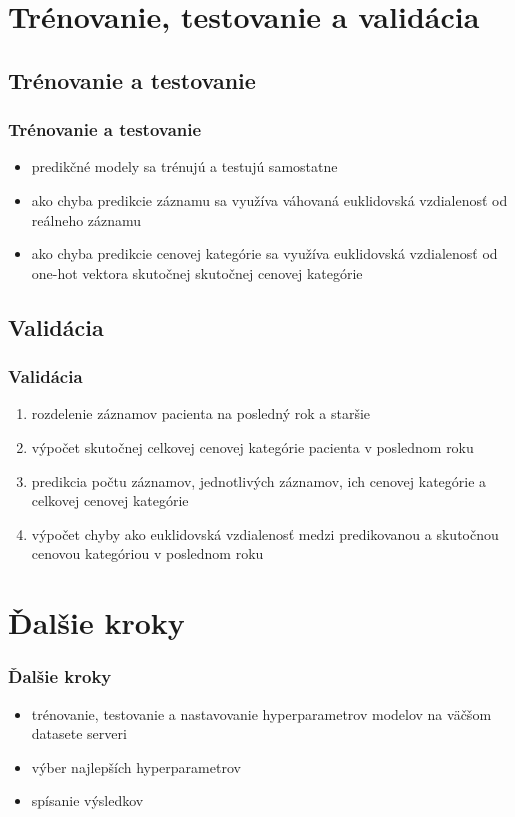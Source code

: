 \documentclass[slovak]{beamer}
\begin{document}
\section{Trénovanie, testovanie a validácia}

\subsection{Trénovanie a testovanie}

\begin{frame}
	\frametitle{Trénovanie a testovanie}
	\begin{itemize}
		\item<1> predikčné modely sa trénujú a testujú samostatne
		\item<1> ako chyba predikcie záznamu sa využíva váhovaná euklidovská vzdialenosť od reálneho záznamu
		\item<1> ako chyba predikcie cenovej kategórie sa využíva euklidovská vzdialenosť od one-hot vektora skutočnej skutočnej cenovej kategórie
		
	\end{itemize}
\end{frame}

\subsection{Validácia}

\begin{frame}
	\frametitle{Validácia}
	
		\begin{enumerate}
			\item<1> rozdelenie záznamov pacienta na posledný rok a staršie 
			\item<1> výpočet skutočnej celkovej cenovej kategórie pacienta v poslednom roku 
			\item<1> predikcia počtu záznamov, jednotlivých záznamov, ich cenovej kategórie a celkovej cenovej kategórie
			\item<1> výpočet chyby ako euklidovská vzdialenosť medzi predikovanou a skutočnou cenovou kategóriou v poslednom roku 
		\end{enumerate}
\end{frame}

\section{Ďalšie kroky}

\begin{frame}
	\frametitle{Ďalšie kroky}
	\begin{itemize}
		\item<1> trénovanie, testovanie a nastavovanie hyperparametrov modelov na väčšom datasete serveri 
		\item<1> výber najlepších hyperparametrov
		\item<1> spísanie výsledkov
	\end{itemize}
\end{frame}
\end{document}
